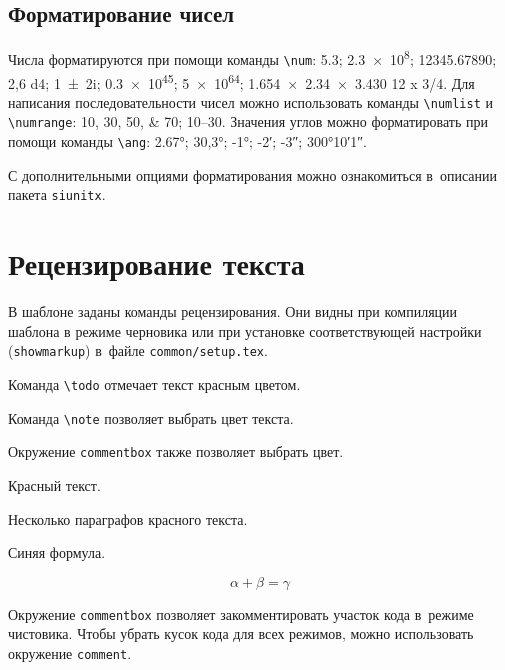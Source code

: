 \subsection{Форматирование чисел}\label{sec:units}

Числа форматируются при помощи команды \verb|\num|:
\num{5.3};
\num{2.3e8};
\num{12345,67890};
\num{2,6 d4};
\num{1+-2i};
\num{.3e45};
\num[exponent-base=2]{5 e64};
\num{1.654 x 2.34 x 3.430}
\num{12 x 3/4}.
Для написания последовательности чисел можно использовать команды \verb|\numlist| и \verb|\numrange|:
\numlist{10;30;50;70}; \numrange{10}{30}.
Значения углов можно форматировать при помощи команды \verb|\ang|:
\ang{2.67};
\ang{30,3};
\ang{-1;;};
\ang{;-2;};
\ang{;;-3};
\ang{300;10;1}.


С дополнительными опциями форматирования можно ознакомиться в~описании пакета \texttt{siunitx}.


\section{Рецензирование текста}\label{sec:markup}

В шаблоне заданы команды рецензирования.
Они видны при компиляции шаблона в режиме черновика или при установке
соответствующей настройки (\verb+showmarkup+) в~файле \verb+common/setup.tex+.

Команда \verb+\todo+ отмечает текст красным цветом.

Команда \verb+\note+ позволяет выбрать цвет текста.
   

Окружение \verb+commentbox+ также позволяет выбрать цвет.

\begin{commentbox}[red]
    Красный текст.

    Несколько параграфов красного текста.
\end{commentbox}

\begin{commentbox}[blue]
    Синяя формула.

    \begin{equation}
        \alpha + \beta = \gamma
    \end{equation}
\end{commentbox}

Окружение \verb+commentbox+ позволяет закомментировать участок кода в~режиме чистовика.
Чтобы убрать кусок кода для всех режимов, можно использовать окружение
\verb+comment+.

\FloatBarrier
